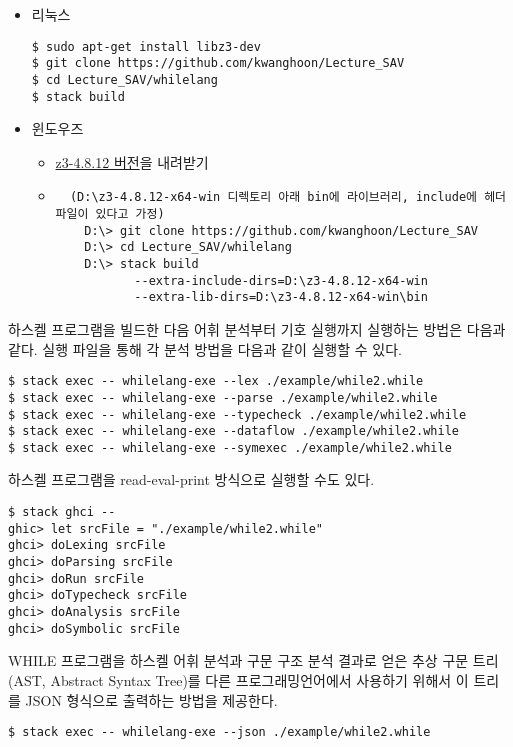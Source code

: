 \documentclass[a4paper]{book}
\begin{document}
\begin{itemize}
\item 리눅스
\begin{verbatim}
$ sudo apt-get install libz3-dev
$ git clone https://github.com/kwanghoon/Lecture_SAV
$ cd Lecture_SAV/whilelang
$ stack build
\end{verbatim}
\item 윈도우즈
  \begin{itemize}
  \item \href{https://github.com/Z3Prover/z3/releases/tag/z3-4.8.12}{z3-4.8.12 버전}을 내려받기
  \item 
  \begin{verbatim}
  (D:\z3-4.8.12-x64-win 디렉토리 아래 bin에 라이브러리, include에 헤더 파일이 있다고 가정)
    D:\> git clone https://github.com/kwanghoon/Lecture_SAV
    D:\> cd Lecture_SAV/whilelang
    D:\> stack build 
           --extra-include-dirs=D:\z3-4.8.12-x64-win
           --extra-lib-dirs=D:\z3-4.8.12-x64-win\bin
  \end{verbatim}
  \end{itemize}
\end{itemize}

하스켈 프로그램을 빌드한 다음 어휘 분석부터 기호 실행까지 실행하는
방법은 다음과 같다. 실행 파일을 통해 각 분석 방법을 다음과 같이 실행할
수 있다.

\begin{verbatim}
$ stack exec -- whilelang-exe --lex ./example/while2.while
$ stack exec -- whilelang-exe --parse ./example/while2.while
$ stack exec -- whilelang-exe --typecheck ./example/while2.while
$ stack exec -- whilelang-exe --dataflow ./example/while2.while
$ stack exec -- whilelang-exe --symexec ./example/while2.while
\end{verbatim}

하스켈 프로그램을 read-eval-print 방식으로 실행할 수도 있다. 

\begin{verbatim}
$ stack ghci --
ghic> let srcFile = "./example/while2.while"
ghci> doLexing srcFile
ghci> doParsing srcFile
ghci> doRun srcFile
ghci> doTypecheck srcFile
ghci> doAnalysis srcFile
ghci> doSymbolic srcFile
\end{verbatim}

WHILE 프로그램을 하스켈 어휘 분석과 구문 구조 분석 결과로 얻은 추상
구문 트리(AST, Abstract Syntax Tree)를 다른 프로그래밍언어에서
사용하기 위해서 이 트리를 JSON 형식으로 출력하는 방법을 제공한다.

\begin{verbatim}
$ stack exec -- whilelang-exe --json ./example/while2.while
\end{verbatim}
\end{document}
